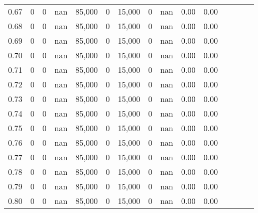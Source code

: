 \begin{tabular}{rrrcrrrrrrrrrrr}
0.67 &      0 &    0 &                                        nan &  85,000 &       0 &  15,000 &       0 &   nan &  0.00 &                         0.00 \\
0.68 &      0 &    0 &                                        nan &  85,000 &       0 &  15,000 &       0 &   nan &  0.00 &                         0.00 \\
0.69 &      0 &    0 &                                        nan &  85,000 &       0 &  15,000 &       0 &   nan &  0.00 &                         0.00 \\
0.70 &      0 &    0 &                                        nan &  85,000 &       0 &  15,000 &       0 &   nan &  0.00 &                         0.00 \\
0.71 &      0 &    0 &                                        nan &  85,000 &       0 &  15,000 &       0 &   nan &  0.00 &                         0.00 \\
0.72 &      0 &    0 &                                        nan &  85,000 &       0 &  15,000 &       0 &   nan &  0.00 &                         0.00 \\
0.73 &      0 &    0 &                                        nan &  85,000 &       0 &  15,000 &       0 &   nan &  0.00 &                         0.00 \\
0.74 &      0 &    0 &                                        nan &  85,000 &       0 &  15,000 &       0 &   nan &  0.00 &                         0.00 \\
0.75 &      0 &    0 &                                        nan &  85,000 &       0 &  15,000 &       0 &   nan &  0.00 &                         0.00 \\
0.76 &      0 &    0 &                                        nan &  85,000 &       0 &  15,000 &       0 &   nan &  0.00 &                         0.00 \\
0.77 &      0 &    0 &                                        nan &  85,000 &       0 &  15,000 &       0 &   nan &  0.00 &                         0.00 \\
0.78 &      0 &    0 &                                        nan &  85,000 &       0 &  15,000 &       0 &   nan &  0.00 &                         0.00 \\
0.79 &      0 &    0 &                                        nan &  85,000 &       0 &  15,000 &       0 &   nan &  0.00 &                         0.00 \\
0.80 &      0 &    0 &                                        nan &  85,000 &       0 &  15,000 &       0 &   nan &  0.00 &                         0.00 \\

\end{tabular}
